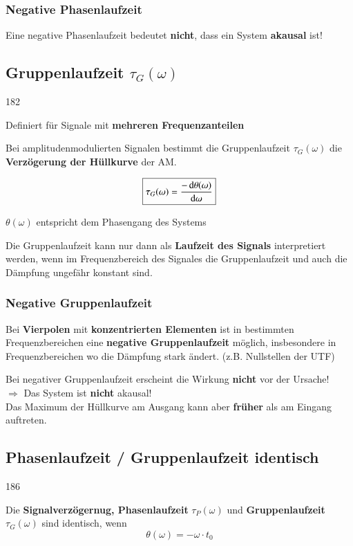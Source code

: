 \subsubsection{Negative Phasenlaufzeit}

Eine negative Phasenlaufzeit bedeutet \textbf{nicht}, dass ein System \textbf{akausal} ist!


\subsection{Gruppenlaufzeit \texorpdfstring{$\tau_G(\omega)$}{tG(w)} }{182}

Definiert für Signale mit \textbf{mehreren Frequenzanteilen}\medskip

Bei amplitudenmodulierten Signalen bestimmt die Gruppenlaufzeit $\tau_G(\omega)$ die \textbf{Verzögerung der Hüllkurve} der AM.

$$ \boxed{ \tau_G(\omega) = \frac{-\mathop{} \! \mathrm{d} \theta(\omega)}{\mathop{} \! \mathrm{d} \omega} } $$

$\theta(\omega)$ entspricht dem Phasengang des Systems\medskip

Die Gruppenlaufzeit kann nur dann als \textbf{Laufzeit des Signals} interpretiert werden, wenn im Frequenzbereich des Signales 
die Gruppenlaufzeit und auch die Dämpfung ungefähr konstant sind.


\subsubsection{Negative Gruppenlaufzeit}

Bei \textbf{Vierpolen} mit \textbf{konzentrierten Elementen} ist in bestimmten Frequenzbereichen eine 
\textbf{negative Gruppenlaufzeit} möglich, insbesondere in Frequenzbereichen wo die Dämpfung stark ändert.
(z.B. Nullstellen der UTF) 

Bei negativer Gruppenlaufzeit erscheint die Wirkung \textbf{nicht} vor der Ursache! \\
$\Rightarrow$ Das System ist \textbf{nicht} akausal! \\
Das Maximum der Hüllkurve am Ausgang kann aber \textbf{früher} als am Eingang auftreten.


\subsection{Phasenlaufzeit / Gruppenlaufzeit identisch}{186}\label{Phasenlaufzeit / Gruppenlaufzeit identisch}

Die \textbf{Signalverzögernug, Phasenlaufzeit} $\tau_P(\omega)$ und \textbf{Gruppenlaufzeit} 
$\tau_G(\omega)$ sind identisch, wenn
$$ \boxed{ \theta(\omega) = - \omega \cdot t_0  } $$

